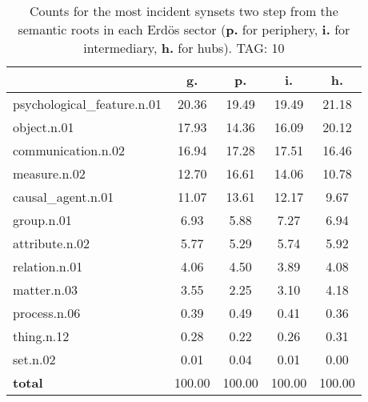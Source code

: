\begin{table}[h!]
\begin{center}
\begin{tabular}{| l || c | c | c | c |}\hline
 & {\bf g.} & {\bf p.} & {\bf i.} & {\bf h.} \\\hline\hline
psychological\_feature.n.01 & 20.36  & 19.49  & 19.49  & 21.18 \\\hline
object.n.01 & 17.93  & 14.36  & 16.09  & 20.12 \\\hline
communication.n.02 & 16.94  & 17.28  & 17.51  & 16.46 \\\hline
measure.n.02 & 12.70  & 16.61  & 14.06  & 10.78 \\\hline
causal\_agent.n.01 & 11.07  & 13.61  & 12.17  & 9.67 \\\hline
group.n.01 & 6.93  & 5.88  & 7.27  & 6.94 \\\hline
attribute.n.02 & 5.77  & 5.29  & 5.74  & 5.92 \\\hline
relation.n.01 & 4.06  & 4.50  & 3.89  & 4.08 \\\hline
matter.n.03 & 3.55  & 2.25  & 3.10  & 4.18 \\\hline
process.n.06 & 0.39  & 0.49  & 0.41  & 0.36 \\\hline
thing.n.12 & 0.28  & 0.22  & 0.26  & 0.31 \\\hline
set.n.02 & 0.01  & 0.04  & 0.01  & 0.00 \\\hline\hline
{{\bf total}} & 100.00  & 100.00  & 100.00  & 100.00 \\\hline
\end{tabular}
\caption{Counts for the most incident synsets two step from the semantic roots in each Erd\"os sector ({\bf p.} for periphery, {\bf i.} for intermediary, {\bf h.} for hubs). TAG: 10}
\end{center}
\end{table}